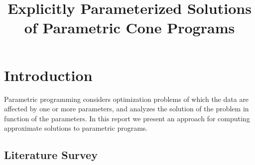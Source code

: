 \documentclass{article}
\begin{document}
\title{Explicitly Parameterized Solutions of Parametric Cone Programs}

\maketitle


\section{Introduction}

Parametric programming considers optimization problems of which the data are affected by one or more parameters, and analyzes the solution of the problem in function of the parameters. In this report we present an approach for computing approximate solutions to parametric programs.


\subsection{Literature Survey}
\end{document}
